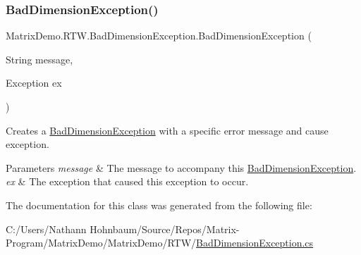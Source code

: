 \subsubsection{\texorpdfstring{Bad\+Dimension\+Exception()}{BadDimensionException()}\hspace{0.1cm}{\footnotesize\ttfamily [4/4]}}
{\footnotesize\ttfamily Matrix\+Demo.\+R\+T\+W.\+Bad\+Dimension\+Exception.\+Bad\+Dimension\+Exception (\begin{DoxyParamCaption}\item[{String}]{message,  }\item[{Exception}]{ex }\end{DoxyParamCaption})}



Creates a \mbox{\hyperlink{class_matrix_demo_1_1_r_t_w_1_1_bad_dimension_exception}{Bad\+Dimension\+Exception}} with a specific error message and cause exception. 


\begin{DoxyParams}{Parameters}
{\em message} & The message to accompany this \mbox{\hyperlink{class_matrix_demo_1_1_r_t_w_1_1_bad_dimension_exception}{Bad\+Dimension\+Exception}}.\\
\hline
{\em ex} & The exception that caused this exception to occur.\\
\hline
\end{DoxyParams}


The documentation for this class was generated from the following file\+:\begin{DoxyCompactItemize}
\item 
C\+:/\+Users/\+Nathann Hohnbaum/\+Source/\+Repos/\+Matrix-\/\+Program/\+Matrix\+Demo/\+Matrix\+Demo/\+R\+T\+W/\mbox{\hyperlink{_bad_dimension_exception_8cs}{Bad\+Dimension\+Exception.\+cs}}\end{DoxyCompactItemize}
